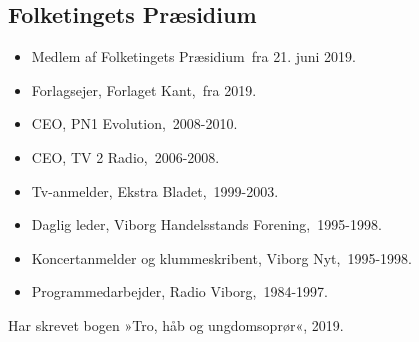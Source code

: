 \documentclass[11pt, a4paper]{awesome-cv}
\begin{document}
\begin{cvletter}
\subsection*{Folketingets Præsidium}
\begin{itemize}
\item Medlem af Folketingets Præsidium fra 21. juni 2019.
\end{itemize}
\begin{itemize}
\item Forlagsejer, Forlaget Kant, fra 2019.
\item CEO, PN1 Evolution, 2008-2010.
\item CEO, TV 2 Radio, 2006-2008.
\item Tv-anmelder, Ekstra Bladet, 1999-2003.
\item Daglig leder, Viborg Handelsstands Forening, 1995-1998.
\item Koncertanmelder og klummeskribent, Viborg Nyt, 1995-1998.
\item Programmedarbejder, Radio Viborg, 1984-1997.
\end{itemize}
Har skrevet bogen »Tro, håb og ungdomsoprør«, 2019.

\end{cvletter}
\end{document}
